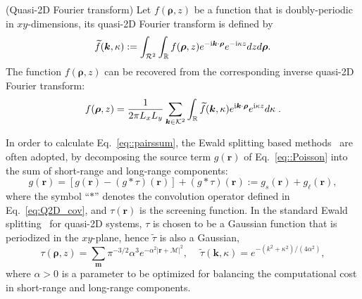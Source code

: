 \begin{defination}\label{Def::Fourier}(Quasi-2D Fourier transform) 
	Let $f(\bm{\rho},z)$ be a function that is doubly-periodic in $xy$-dimensions, its quasi-2D Fourier transform is defined by
	\begin{equation}
		\widetilde{f}(\bm{k},\kappa):=\int_{\mathcal{R}^2}\int_{\mathbb{R}}f(\bm{\rho},z)e^{-\mathrm{i} \bm{k}\cdot\bm{\rho}}e^{- \mathrm{i} \kappa z}dzd\bm{\rho}.
	\end{equation}
	The function $f(\bm{\rho},z)$ can be recovered from the corresponding inverse quasi-2D Fourier transform:
	\begin{equation}
		f(\bm{\rho},z)=\frac{1}{2 \pi L_x L_y}\sum_{\bm{k} \in \mathcal{K}^2} \int_{\mathbb{R}} \widetilde{f}(\bm{k}, \kappa) e^{\mathrm{i} \bm{k} \cdot \bm{\rho}} e^{\mathrm{i} \kappa z} d\kappa\;.
	\end{equation}
\end{defination}

In order to calculate Eq.~\eqref{eq::pairssum}, the Ewald splitting based methods~\cite{Ewald1921AnnPhys} are often adopted, by decomposing the source term $g(\bm{r})$ of Eq.~\eqref{eq::Poisson} into the sum of short-range and long-range components:
\begin{equation}
	g(\bm{r})=\left[g(\bm{r})-(g\ast\tau)(\bm{r})\right]+(g\ast\tau)(\bm{r}):=g_{s}(\bm{r})+g_{\ell}(\bm{r}),
\end{equation}
where the symbol ``$\ast$'' denotes the convolution operator defined in Eq.~\eqref{eq:Q2D_cov}, and $\tau(\bm{r})$ is the screening function.
In the standard Ewald splitting~\cite{Ewald1921AnnPhys,tornberg2016ewald} for quasi-2D systems, $\tau$ is chosen to be a Gaussian function that is periodized in the $xy$-plane, hence $\widetilde{\tau}$ is also a Gaussian, 
\begin{equation}  
\tau(\bm{\rho},z)=\sum_{\bm{m}}\pi^{-3/2}\alpha^3 e^{-\alpha^2 |\bm{r}+\bm{\mathcal{M}}|^2},\quad~ \widetilde{\tau}(\bm{k},\kappa)=e^{-(k^2+\kappa^2)/(4\alpha^2)},
\end{equation}
where $\alpha>0$ is a parameter to be optimized for balancing the computational cost in short-range and long-range components.


